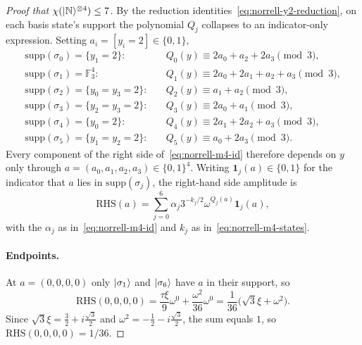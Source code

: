 \documentclass[11pt]{article}
\theoremstyle{definition}
\newcommand{\microspace}{\mspace{0.5mu}}
\newcommand{\ket}[1]{\lvert\microspace #1 \microspace \rangle}
\newcommand{\F}{\mathcal{F}}
\renewcommand{\F}[1]{\mathbb{F}_{#1}}
\newcommand{\chiR}{\chi}
\newcommand{\Norrell}{\ket{\mathbb{N}}}
\begin{document}
\begin{proof}[Proof that $\chiR(\Norrell^{\otimes 4}) \le 7$]
		By the reduction identities~\eqref{eq:norrell-y2-reduction}, on each
		basis state's support the polynomial $Q_j$ collapses to an
		indicator-only expression. Setting $a_i = [y_i = 2] \in \{0, 1\}$,
		\begin{equation}\label{eq:norrell-m4-Qreductions}
			\begin{aligned}
				\mathrm{supp}(\sigma_0) = \{y_1 = 2\}\colon\quad
				& Q_0(y) \equiv 2 a_0 + a_2 + 2 a_3 \pmod 3, \\
				\mathrm{supp}(\sigma_1) = \F{3}^4\colon\quad
				& Q_1(y) \equiv 2 a_0 + 2 a_1 + a_2 + a_3 \pmod 3, \\
				\mathrm{supp}(\sigma_2) = \{y_0 = y_3 = 2\}\colon\quad
				& Q_2(y) \equiv a_1 + a_2 \pmod 3, \\
				\mathrm{supp}(\sigma_3) = \{y_2 = y_3 = 2\}\colon\quad
				& Q_3(y) \equiv 2 a_0 + a_1 \pmod 3, \\
				\mathrm{supp}(\sigma_4) = \{y_0 = 2\}\colon\quad
				& Q_4(y) \equiv 2 a_1 + 2 a_2 + a_3 \pmod 3, \\
				\mathrm{supp}(\sigma_5) = \{y_1 = y_2 = 2\}\colon\quad
				& Q_5(y) \equiv a_0 + 2 a_3 \pmod 3.
			\end{aligned}
		\end{equation}
		Every component of the right side of~\eqref{eq:norrell-m4-id} therefore
		depends on $y$ only through $a = (a_0, a_1, a_2, a_3) \in \{0,1\}^4$.
		Writing $\mathbf{1}_j(a) \in \{0, 1\}$ for the indicator that $a$ lies in
		$\mathrm{supp}(\sigma_j)$, the right-hand side amplitude is
		\begin{equation}\label{eq:norrell-m4-rhs}
			\mathrm{RHS}(a) = \sum_{j=0}^{6} \alpha_j 3^{-k_j/2}
			\omega^{Q_j(a)} \mathbf{1}_j(a),
		\end{equation}
		with the $\alpha_j$ as in~\eqref{eq:norrell-m4-id} and $k_j$ as
		in~\eqref{eq:norrell-m4-states}.
		
		\paragraph{Endpoints.}
		At $a = (0, 0, 0, 0)$ only $\ket{\sigma_1}$ and $\ket{\sigma_6}$ have $a$ in
		their support, so
		\begin{equation}\label{eq:norrell-m4-rhs0}
			\mathrm{RHS}(0,0,0,0)
			= \frac{\tau\xi}{9} \omega^0 + \frac{\omega^2}{36} \omega^0
			= \frac{1}{36} \big( \sqrt 3\xi + \omega^2 \big).
		\end{equation}
		Since $\sqrt 3\xi = \frac{3}{2} + i \frac{\sqrt 3}{2}$ and
		$\omega^2 = -\frac{1}{2} - i \frac{\sqrt 3}{2}$, the sum equals
		$1$, so $\mathrm{RHS}(0,0,0,0) = 1/36$.
		

\end{proof}
\end{document}
